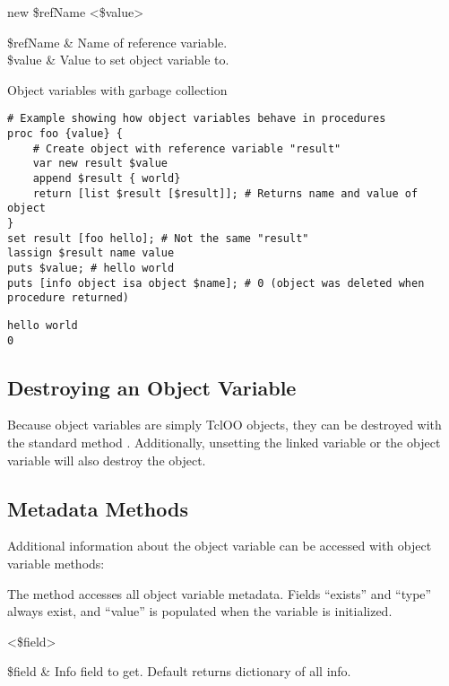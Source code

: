 \documentclass{article}
\begin{document}
\begin{syntax}
 new \$refName <\$value>
\end{syntax}
\begin{args}
\$refName & Name of reference variable. \\
\$value & Value to set object variable to. 
\end{args}

\begin{example}{Object variables with garbage collection}
\begin{lstlisting}
# Example showing how object variables behave in procedures
proc foo {value} {
    # Create object with reference variable "result"
    var new result $value
    append $result { world}
    return [list $result [$result]]; # Returns name and value of object
}
set result [foo hello]; # Not the same "result"
lassign $result name value
puts $value; # hello world
puts [info object isa object $name]; # 0 (object was deleted when procedure returned)
\end{lstlisting}
\tcblower
\begin{lstlisting}
hello world
0
\end{lstlisting}
\end{example}

\subsection{Destroying an Object Variable}
Because object variables are simply TclOO objects, they can be destroyed with the standard method . 
Additionally, unsetting the linked variable or the object variable will also destroy the object.
\begin{syntax}
\end{syntax}


\clearpage
\subsection{Metadata Methods}
Additional information about the object variable can be accessed with object variable methods:

The method  accesses all object variable metadata. 
Fields ``exists'' and ``type'' always exist, and ``value'' is populated when the variable is initialized.
\begin{syntax}
 <\$field>
\end{syntax}
\begin{args}
\$field & Info field to get. Default returns dictionary of all info. \\
\end{args}
\end{document}
